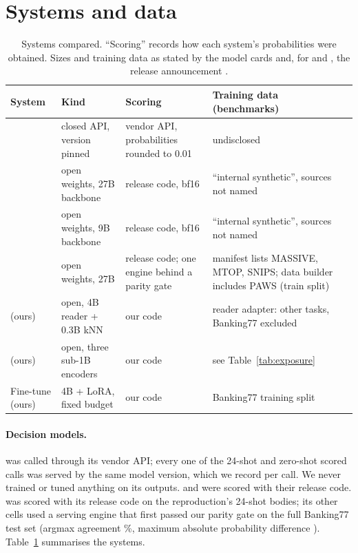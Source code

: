 \section{Systems and data}
\label{sec:systems}

\begin{table}[t]
\centering\small
\caption{Systems compared. ``Scoring'' records how each system's probabilities were obtained. Sizes and training
data as stated by the model cards and, for \clef{} and \flash, the release announcement
\citep{cloudflare-2026-clef-card,cloudflare-2026-clef-flash-card,chen-etal-2026-clef-blog,perplexity-2026-pplx-decider-card}.}
\label{tab:systems}
\begin{tabular}{@{}>{\raggedright\arraybackslash}p{2.3cm}>{\raggedright\arraybackslash}p{3.4cm}>{\raggedright\arraybackslash}p{4.6cm}>{\raggedright\arraybackslash}p{4.6cm}@{}}
\toprule
System & Kind & Scoring & Training data (benchmarks) \\
\midrule
\jev{} & closed API, version pinned & vendor API, probabilities rounded to 0.01 & undisclosed \\ %
\clef{} & open weights, 27B backbone & release code, bf16 & ``internal synthetic'', sources not named \\
\flash{} & open weights, 9B backbone & release code, bf16 & ``internal synthetic'', sources not named \\
\pplx{} & open weights, 27B & release code; one engine behind a parity gate & manifest lists MASSIVE, MTOP, SNIPS; data builder includes PAWS (train split) \\
\midrule
\orb{} (ours) & open, 4B reader + 0.3B kNN & our code & reader adapter: other tasks, Banking77 excluded \\
\gj{} (ours) & open, three sub-1B encoders & our code & see Table~\ref{tab:exposure} \\
Fine-tune (ours) & 4B + LoRA, fixed budget & our code & Banking77 training split \\
\bottomrule
\end{tabular}
\end{table}

\paragraph{Decision models.} \jev{} was called through its vendor API; every one of the \fsJevFsCalls{} 24-shot
and \fsJevZsCalls{} zero-shot scored calls was served by the same model version, which we record per call. We never
trained or tuned anything on its outputs. \clef{} and \flash{} were scored with their release code. \pplx{} was
scored with its release code on the reproduction's 24-shot bodies; its other cells used a serving engine that first
passed our parity gate on the full Banking77 test set (argmax agreement \fsPplxGateAgree\%, maximum absolute
probability difference \fsPplxGateMaxDp). Table~\ref{tab:systems} summarises the systems.

